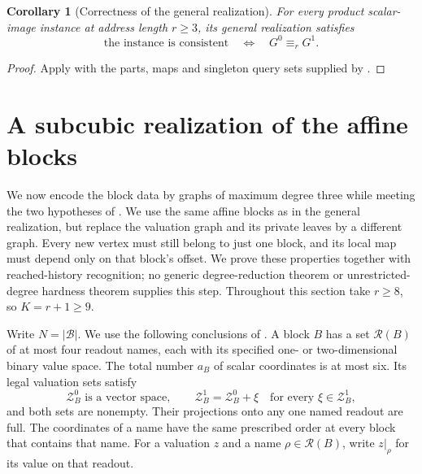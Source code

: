 \documentclass[11pt]{article}
\newtheorem{corollary}[theorem]{Corollary}
\theoremstyle{definition}
\begin{document}
\begin{corollary}[Correctness of the general realization]
\label{cor:general-game}
For every product scalar-image instance at address length \(r\ge3\),
its general realization satisfies
\[
 \text{the instance is consistent}\quad\Longleftrightarrow\quad
 G^0\equiv_r G^1.
\]
\end{corollary}
\begin{proof}
Apply  with the parts, maps and singleton
query sets supplied by .
\end{proof}

\section{A subcubic realization of the affine blocks}
\label{graph:section}

We now encode the block data by graphs of maximum degree three while
meeting the two hypotheses of .
We use the same affine blocks as in the general realization, but replace
the valuation graph and its private leaves by a different graph. Every
new vertex must still belong to just one block, and its local map must
depend only on that block's offset. We prove these properties together
with reached-history recognition; no generic degree-reduction theorem
or unrestricted-degree hardness theorem supplies this step.
Throughout this section take \(r\ge8\), so \(K=r+1\ge9\).

Write \(N=\left\lvert{\mathcal B}\right\rvert\).  We use the following conclusions of
.  A block \(B\) has a set \(\mathcal R(B)\) of at most four
readout names, each with its specified one- or two-dimensional binary
value space.  The total number \(a_B\) of scalar coordinates is at most
six.  Its legal valuation sets satisfy
\[
  \mathcal Z_B^0\text{ is a vector space},\qquad
  \mathcal Z_B^1=\mathcal Z_B^0+\xi
       \quad\text{for every }\xi\in\mathcal Z_B^1,
\]
and both sets are nonempty.  Their projections onto any one named
readout are full.  The coordinates of a name have the same prescribed
order at every block that contains that name.  For a valuation \(z\)
and a name \(\rho\in\mathcal R(B)\), write \(z|_\rho\) for its value on that
readout.
\end{document}
